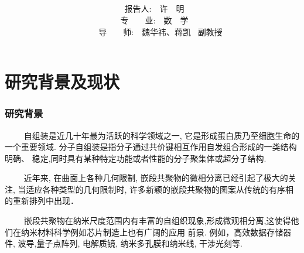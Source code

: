 \documentclass[notheorems,serif]{beamer}
\begin{document}
\title[湘潭大学硕士研究生开题报告]{{\small {}~~~~~~~~~~~~~~~~~~~~~~~~~~~~~~~~~~~~~~~~~~~~~~
~~~~~~~~~~~} \\
}




\author[许明]{~~~报告人:~~许~~明~~ \\
\vspace{0.2cm}
		~~~专~~~~业:~~数~~学~~\\
\vspace{0.2cm}
              \qquad\qquad\qquad　~~导~~~~师:~~魏华祎、蒋凯 ~副教授\\
                }

\institute[湘潭大学数学与计算科学学院 ]

\date[\today]






\frame[plain]{\titlepage}


\section{研究背景及现状}

\begin{frame}
    \frametitle{研究背景}
%

~~~~ 自组装是近几十年最为活跃的科学领域之一, 它是形成蛋白质乃至细胞生命的
一个重要领域. 分子自组装是指分子通过共价键相互作用自发组合形成的一类结构明确、
稳定,同时具有某种特定功能或者性能的分子聚集体或超分子结构.

~~~~ 近年来, 在曲面上各种几何限制, 嵌段共聚物的微相分离已经引起了极大的关注, 当适应各种类型的几何限制时,
许多新颖的嵌段共聚物的图案从传统的有序相的重新排列中出现．  


~~~~ 嵌段共聚物在纳米尺度范围内有丰富的自组织现象,形成微观相分离,这使得他们在纳米材料科学例如芯片制造上也有广阔的应用
前景. 例如，高效数据存储器件, 波导,量子点阵列, 电解质镜, 纳米多孔膜和纳米线, 干涉光刻等.

\end{frame}
\end{document}
